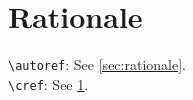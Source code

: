 \documentclass[twocolumn]{article}
\theoremstyle{definition}
\theoremstyle{remark}
\begin{document}








\appendix
\onecolumn
\maketitlesupplementary

\section{Rationale}
\label{sec:rationale}

\verb+\autoref+: See \autoref{sec:rationale}. \\
\verb+\cref+: See \cref{sec:rationale}.

\lipsum[10]
\end{document}
